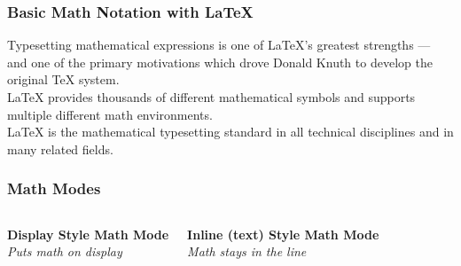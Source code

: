 \begin{frame}[fragile]
\frametitle{Basic Math Notation with \LaTeX{}}
Typesetting mathematical expressions is one of \LaTeX{}'s greatest strengths --- and one of the primary motivations which drove Donald Knuth to develop the original TeX system. \\[\baselineskip]
\LaTeX{} provides thousands of different mathematical symbols and supports multiple different math environments. \\[\baselineskip]
\LaTeX{} is the mathematical typesetting standard in all technical disciplines and in many related fields.
\end{frame}

\begin{frame}[fragile]
\frametitle{Math Modes}
\begin{columns}
\begin{center}
    \textbf{Display Style Math Mode} \\
    \textit{Puts math on display} \\
    \vspace{0.4cm}
\end{center}

\begin{center}
    \textbf{Inline (text) Style Math Mode} \\
    \textit{Math stays in the line} \\
    \vspace{0.4cm}
\end{center}
\end{columns}
\end{frame}



